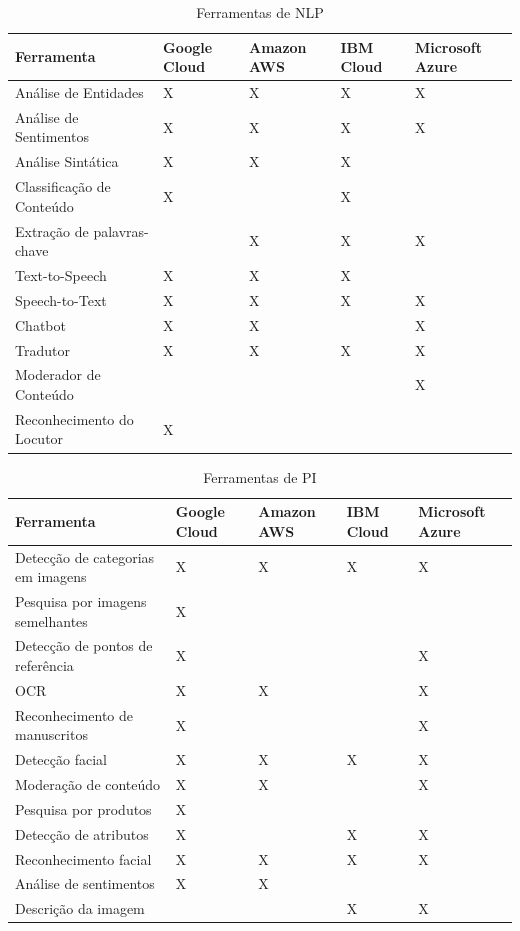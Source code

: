 \documentclass{article}
\begin{document}
\begin{table}[!!ht]
 \caption{Ferramentas de NLP}
  \centering
  \begin{tabular}{lllll}
  \toprule
    \cmidrule(r){1-5}
    Ferramenta & Google Cloud & Amazon AWS & IBM Cloud & Microsoft Azure \\
    \midrule
    Análise de Entidades & X & X & X & X  \\
    Análise de Sentimentos & X & X & X & X   \\
    Análise Sintática & X & X & X & \\
    Classificação de Conteúdo & X & & X & \\
    Extração de palavras-chave & & X & X & X \\
    Text-to-Speech & X & X & X &\\
    Speech-to-Text & X & X & X & X \\
    Chatbot & X & X & & X \\
    Tradutor & X & X & X & X \\
    Moderador de Conteúdo & & & & X \\
    Reconhecimento do Locutor & X & & & \\
    \bottomrule
  \end{tabular}
  \label{tab:table1}
\end{table}

\begin{table}[!!ht]
 \caption{Ferramentas de PI}
  \centering
  \begin{tabular}{lllll}
    \cmidrule(r){1-5}
    Ferramenta & Google Cloud & Amazon AWS & IBM Cloud & Microsoft Azure \\
    \midrule
    Detecção de categorias em imagens & X & X & X & X \\
    Pesquisa por imagens semelhantes & X & & & \\
    Detecção de pontos de referência & X & & & X \\
    OCR & X & X & & X \\
    Reconhecimento de manuscritos & X & & & X \\
    Detecção facial & X & X & X & X \\
    Moderação de conteúdo & X & X & & X \\
    Pesquisa por produtos & X & & & \\
    Detecção de atributos & X & & X & X \\
    Reconhecimento facial & X & X & X & X \\
    Análise de sentimentos & X & X & &  \\
    Descrição da imagem & & & X & X \\
    \bottomrule
  \end{tabular}
  \label{tab:table2}
\end{table}
\end{document}
